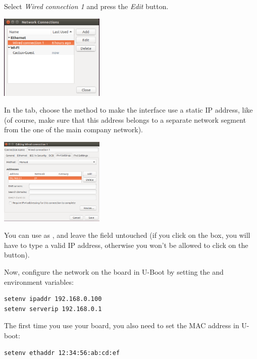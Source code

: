 Select {\em Wired connection 1} and press the {\em Edit} button.

\begin{center}
\includegraphics[width=5cm]{labs/sysdev-u-boot/network-config-2.png}
\end{center}

In the  tab, choose the  method
to make the interface use a static IP address, like 
(of course, make sure that this address belongs to a separate network
segment from the one of the main company network).

\begin{center}
\includegraphics[width=5cm]{labs/sysdev-u-boot/network-config-3.png}
\end{center}

You can use  as , and leave the
 field untouched (if you click on the  box, you
will have to type a valid IP address, otherwise you won't be allowed to
click on the  button).

Now, configure the network on the board in U-Boot by setting the 
and  environment variables:

\begin{verbatim}
setenv ipaddr 192.168.0.100
setenv serverip 192.168.0.1
\end{verbatim}

The first time you use your board, you also need to set the MAC
address in U-boot:

\begin{verbatim}
setenv ethaddr 12:34:56:ab:cd:ef
\end{verbatim}

